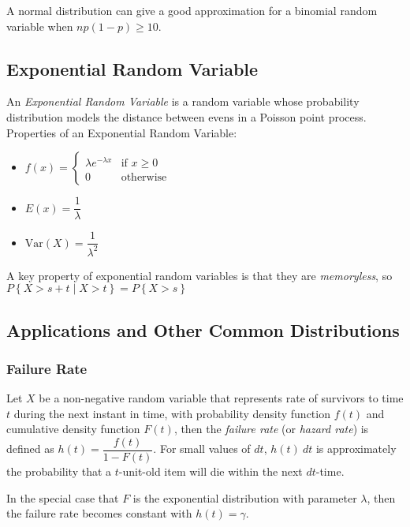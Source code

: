 \documentclass[10pt]{article}
\begin{document}
		A normal distribution can give a good approximation for a binomial random variable when \(np(1-p) \geq 10\).
		
		\subsection*{Exponential Random Variable}
		An \emph{Exponential Random Variable} is a random variable whose probability distribution models the distance between evens in a Poisson point process. Properties of an Exponential Random Variable:
		\begin{multicols}{3}
			\begin{itemize}
				\item $f(x) = 
				\begin{cases} 
					\lambda e ^ {-\lambda x} & \text{if }  x \geq 0 \\
					0 & \text{otherwise}
				\end{cases}$
				\item $E(x) = \dfrac{1}{\lambda}$
				\item $\text{Var}(X) = \dfrac{1}{\lambda^2}$
			\end{itemize}
		\end{multicols}
		A key property of exponential random variables is that they are \emph{memoryless}, so \(P\left\{X>s+t \mid X >t\right\} = P\left\{X > s \right\}\)
		
		\subsection*{Applications and Other Common Distributions}
		\subsubsection*{Failure Rate}
		Let \(X\) be a non-negative random variable that represents rate of survivors to time \(t\) during the next instant in time, with probability density function \(f(t)\) and cumulative density function \(F(t)\), then the \emph{failure rate} (or \emph{hazard rate}) is defined as \(h(t) = \dfrac{f(t)}{1-F(t)}\). For small values of \(dt\), \(h(t)\: dt\) is approximately the probability that a \(t\)-unit-old item will die within the next \(dt\)-time.
		
		In the special case that $F$ is the exponential distribution with parameter \(\lambda\), then the failure rate becomes constant with \(h(t)=\gamma\).
		
		\newpage
		
\end{document}
